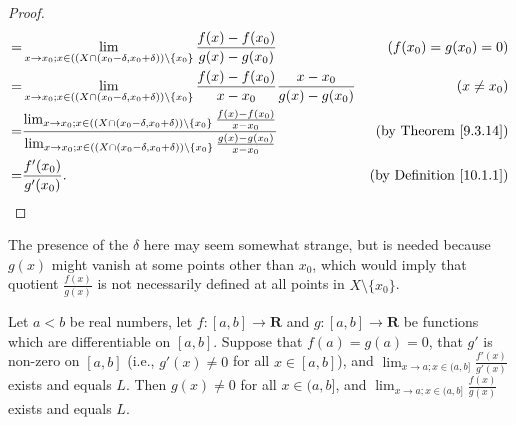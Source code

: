 \begin{proof}
\begin{align*}
        = & \lim_{x \to x_0 ; x \in ((X \cap (x_0 - \delta, x_0 + \delta)) \setminus \{x_0\}} \frac{f(x) - f(x_0)}{g(x) - g(x_0)}                                                                                                                   & (f(x_0) = g(x_0) = 0)               \\
        = & \lim_{x \to x_0 ; x \in ((X \cap (x_0 - \delta, x_0 + \delta)) \setminus \{x_0\}} \frac{f(x) - f(x_0)}{x - x_0} \frac{x - x_0}{g(x) - g(x_0)}                                                                                           & (x \neq x_0)                        \\
        = & \frac{\lim_{x \to x_0 ; x \in ((X \cap (x_0 - \delta, x_0 + \delta)) \setminus \{x_0\}} \frac{f(x) - f(x_0)}{x - x_0}}{\lim_{x \to x_0 ; x \in ((X \cap (x_0 - \delta, x_0 + \delta)) \setminus \{x_0\}} \frac{g(x) - g(x_0)}{x - x_0}} & \text{(by Theorem \ref{9.3.14})}    \\
        = & \frac{f'(x_0)}{g'(x_0)}.                                                                                                                                                                                                                & \text{(by Definition \ref{10.1.1})}
    \end{align*}
\end{proof}

\begin{note}
    The presence of the \(\delta\) here may seem somewhat strange, but is needed because \(g(x)\) might vanish at some points other than \(x_0\), which would imply that quotient \(\frac{f(x)}{g(x)}\) is not necessarily defined at all points in \(X \setminus \{x_0\}\).
\end{note}

\begin{proposition}\label{10.5.2}
    Let \(a < b\) be real numbers, let \(f : [a, b] \to \mathbf{R}\) and \(g : [a, b] \to \mathbf{R}\) be functions which are differentiable on \([a, b]\).
    Suppose that \(f(a) = g(a) = 0\), that \(g'\) is non-zero on \([a, b]\) (i.e., \(g'(x) \neq 0\) for all \(x \in [a, b]\)), and \(\lim_{x \to a ; x \in (a, b]} \frac{f'(x)}{g'(x)}\) exists and equals \(L\).
    Then \(g(x) \neq 0\) for all \(x \in (a, b]\), and \(\lim_{x \to a ; x \in (a, b]} \frac{f(x)}{g(x)}\) exists and equals \(L\).
\end{proposition}

